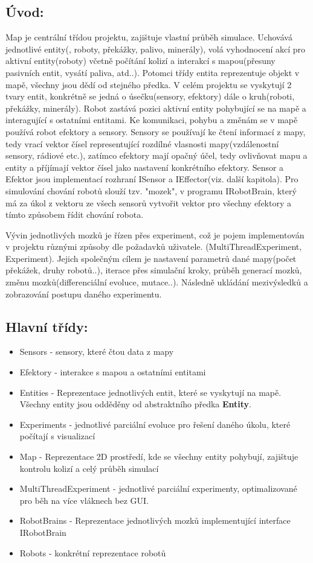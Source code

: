 \documentclass[12pt, oneside]{article}
\begin{document}
\subsection{Úvod:}
Map je centrální třídou projektu, zajištuje vlastní průběh simulace. Uchovává jednotlivé entity(, roboty,  překážky, palivo, minerály), volá vyhodnocení akcí pro aktivní entity(roboty) včetně počítání kolizí a interakcí s mapou(přesuny pasivních entit, vysátí paliva, atd..). Potomci třídy entita reprezentuje objekt v mapě, všechny jsou  dědí od stejného předka. V celém projektu se vyskytují 2 tvary entit, konkrétně se jedná o úsečku(sensory, efektory) dále o kruh(roboti, překážky, minerály). Robot zastává pozici aktivní entity pohybující se na mapě a interagující s ostatními entitami. Ke komunikaci, pohybu a změnám se v mapě používá robot efektory a sensory. Sensory se používají ke čtení informací z mapy, tedy vrací vektor čísel representující rozdílné vlasnosti mapy(vzdálenostní sensory, rádiové etc.), zatímco efektory mají opačný účel, tedy ovlivňovat mapu a entity a příjímají vektor čísel jako nastavení konkrétního efektory. Sensor a Efektor jsou implementací rozhraní ISensor a IEffector(viz. další kapitola). Pro simulování chování robotů slouží tzv. "mozek", v programu IRobotBrain, který má za úkol z vektoru ze všech sensorů vytvořit vektor pro všechny efektory a tímto způsobem řídit chování robota. \par
Vývin jednotlivých mozků je řízen přes experiment, což je pojem implementován v projektu různými způsoby dle požadavků uživatele. (MultiThreadExperiment, Experiment). Jejich společným cílem je nastavení parametrů dané mapy(počet překážek, druhy robotů..), iterace přes simulační kroky, průběh generací mozků, změnu mozků(differenciální evoluce, mutace..). Následně ukládání mezivýsledků a zobrazování postupu daného experimentu. 
\subsection{Hlavní třídy:}
\begin{itemize}
\item Sensors - sensory, které čtou data z  mapy 
\item Efektory - interakce s mapou a ostatními entitami
\item Entities - Reprezentace jednotlivých entit, které se vyskytují na mapě. Všechny entity jsou odděděny od abstraktního předka \textbf{Entity}. 
\item Experiments - jednotlivé parciální evoluce pro řešení daného úkolu, které počítají s visualizací
\item Map - Reprezentace 2D prostředí, kde se všechny entity pohybují, zajištuje kontrolu kolizí a celý průběh simulací
\item MultiThreadExperiment - jednotlivé parciální experimenty, optimalizované pro  běh na více vláknech bez GUI. 
\item RobotBrains - Reprezentace jednotlivých mozků implementující interface IRobotBrain
\item Robots - konkrétní reprezentace robotů 
\end{itemize}
\newpage
\end{document}

